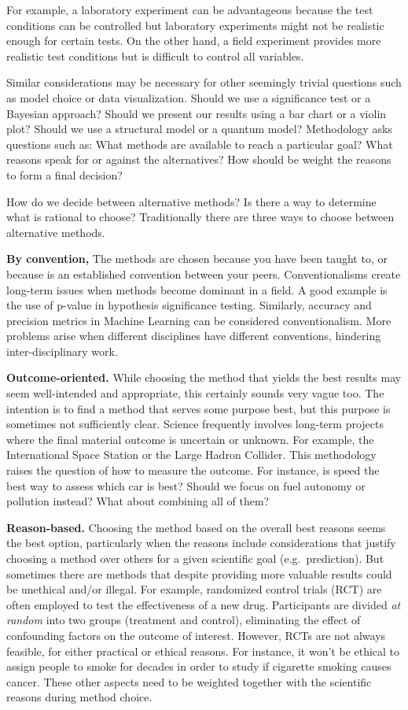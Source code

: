 \documentclass[
]{book}
\begin{document}
For example, a laboratory experiment can be advantageous because the test conditions can be controlled but laboratory experiments might not be realistic enough for certain tests. On the other hand, a field experiment provides more realistic test conditions but is difficult to control all variables.

Similar considerations may be necessary for other seemingly trivial questions such as model choice or data visualization. Should we use a significance test or a Bayesian approach? Should we present our results using a bar chart or a violin plot? Should we use a structural model or a quantum model? Methodology asks questions such as: What methods are available to reach a particular goal? What reasons speak for or against the alternatives? How should be weight the reasons to form a final decision?

How do we decide between alternative methods? Is there a way to determine what is rational to choose?
Traditionally there are three ways to choose between alternative methods.

\textbf{By convention,} The methods are chosen because you have been taught to, or because is an established convention between your peers. Conventionalisms create long-term issues when methods become dominant in a field. A good example is the use of p-value in hypothesis significance testing. Similarly, accuracy and precision metrics in Machine Learning can be considered conventionalism. More problems arise when different disciplines have different conventions, hindering inter-disciplinary work.

\textbf{Outcome-oriented.} While choosing the method that yields the best results may seem well-intended and appropriate, this certainly sounds very vague too. The intention is to find a method that serves some purpose best, but this purpose is sometimes not sufficiently clear. Science frequently involves long-term projects where the final material outcome is uncertain or unknown. For example, the International Space Station or the Large Hadron Collider. This methodology raises the question of how to measure the outcome. For instance, is speed the best way to assess which car is best? Should we focus on fuel autonomy or pollution instead? What about combining all of them?

\textbf{Reason-based.} Choosing the method based on the overall best reasons seems the best option, particularly when the reasons include considerations that justify choosing a method over others for a given scientific goal (e.g.~prediction). But sometimes there are methods that despite providing more valuable results could be unethical and/or illegal. For example, randomized control trials (RCT) are often employed to test the effectiveness of a new drug. Participants are divided \emph{at random} into two groups (treatment and control), eliminating the effect of confounding factors on the outcome of interest. However, RCTs are not always feasible, for either practical or ethical reasons. For instance, it won't be ethical to assign people to smoke for decades in order to study if cigarette smoking causes cancer. These other aspects need to be weighted together with the scientific reasons during method choice.
\end{document}

